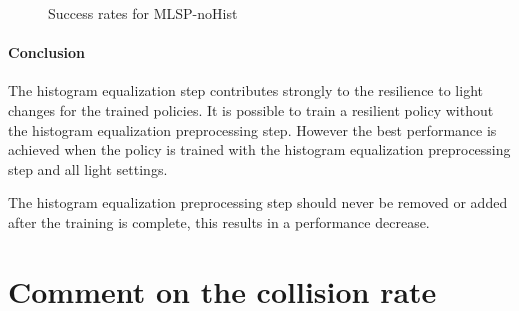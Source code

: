 \begin{figure}
    \centering
    \caption{Success rates for \ac{MLSP-noHist}}
    \label{fig:hardDistance_mixedLight_noHistogramEqualizationTraining_results_withHistogramEqualization}
\end{figure}


\paragraph{Conclusion}
The histogram equalization step contributes strongly to the resilience to light changes for the trained policies. It is possible to train a resilient policy without the histogram equalization preprocessing step.
However the best performance is achieved when the policy is trained with the histogram equalization preprocessing step and all light settings.

The histogram equalization preprocessing step should never be removed or added after the training is complete, this results in a performance decrease.

\section{Comment on the collision rate}
\label{sec:comment_on_collision_rate}

